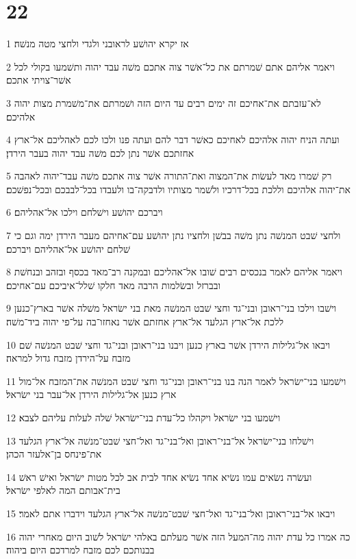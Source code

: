 \chapter{22}

\par 1 אז יקרא יהושׁע לראובני ולגדי ולחצי מטה מנשׁה׃
\par 2 ויאמר אליהם אתם שׁמרתם את כל־אשׁר צוה אתכם משׁה עבד יהוה ותשׁמעו בקולי לכל אשׁר־צויתי אתכם׃
\par 3 לא־עזבתם את־אחיכם זה ימים רבים עד היום הזה ושׁמרתם את־משׁמרת מצות יהוה אלהיכם׃
\par 4 ועתה הניח יהוה אלהיכם לאחיכם כאשׁר דבר להם ועתה פנו ולכו לכם לאהליכם אל־ארץ אחזתכם אשׁר נתן לכם משׁה עבד יהוה בעבר הירדן׃
\par 5 רק שׁמרו מאד לעשׂות את־המצוה ואת־התורה אשׁר צוה אתכם משׁה עבד־יהוה לאהבה את־יהוה אלהיכם וללכת בכל־דרכיו ולשׁמר מצותיו ולדבקה־בו ולעבדו בכל־לבבכם ובכל־נפשׁכם׃
\par 6 ויברכם יהושׁע וישׁלחם וילכו אל־אהליהם׃
\par 7 ולחצי שׁבט המנשׁה נתן משׁה בבשׁן ולחציו נתן יהושׁע עם־אחיהם מעבר הירדן ימה וגם כי שׁלחם יהושׁע אל־אהליהם ויברכם׃
\par 8 ויאמר אליהם לאמר בנכסים רבים שׁובו אל־אהליכם ובמקנה רב־מאד בכסף ובזהב ובנחשׁת ובברזל ובשׂלמות הרבה מאד חלקו שׁלל־איביכם עם־אחיכם׃
\par 9 וישׁבו וילכו בני־ראובן ובני־גד וחצי שׁבט המנשׁה מאת בני ישׂראל משׁלה אשׁר בארץ־כנען ללכת אל־ארץ הגלעד אל־ארץ אחזתם אשׁר נאחזו־בה על־פי יהוה ביד־משׁה׃
\par 10 ויבאו אל־גלילות הירדן אשׁר בארץ כנען ויבנו בני־ראובן ובני־גד וחצי שׁבט המנשׁה שׁם מזבח על־הירדן מזבח גדול למראה׃
\par 11 וישׁמעו בני־ישׂראל לאמר הנה בנו בני־ראובן ובני־גד וחצי שׁבט המנשׁה את־המזבח אל־מול ארץ כנען אל־גלילות הירדן אל־עבר בני ישׂראל׃
\par 12 וישׁמעו בני ישׂראל ויקהלו כל־עדת בני־ישׂראל שׁלה לעלות עליהם לצבא׃
\par 13 וישׁלחו בני־ישׂראל אל־בני־ראובן ואל־בני־גד ואל־חצי שׁבט־מנשׁה אל־ארץ הגלעד את־פינחס בן־אלעזר הכהן׃
\par 14 ועשׂרה נשׂאים עמו נשׂיא אחד נשׂיא אחד לבית אב לכל מטות ישׂראל ואישׁ ראשׁ בית־אבותם המה לאלפי ישׂראל׃
\par 15 ויבאו אל־בני־ראובן ואל־בני־גד ואל־חצי שׁבט־מנשׁה אל־ארץ הגלעד וידברו אתם לאמר׃
\par 16 כה אמרו כל עדת יהוה מה־המעל הזה אשׁר מעלתם באלהי ישׂראל לשׁוב היום מאחרי יהוה בבנותכם לכם מזבח למרדכם היום ביהוה׃
